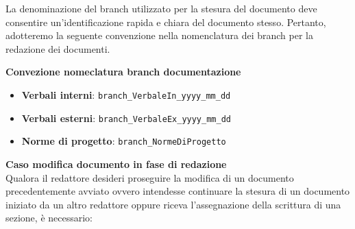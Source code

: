 \documentclass{article}
\begin{document}
    La denominazione del branch utilizzato per la stesura del documento deve consentire un'identificazione rapida e chiara del documento stesso. Pertanto, adotteremo la seguente convenzione nella nomenclatura dei branch per la redazione dei documenti.

    \vspace{0.3cm}
    \textbf{Convezione nomeclatura branch documentazione}
    \begin{itemize}
        \item \textbf{Verbali interni}: \verb|branch_VerbaleIn_yyyy_mm_dd|
        \item \textbf{Verbali esterni}: \verb|branch_VerbaleEx_yyyy_mm_dd|
        \item \textbf{Norme di progetto}: \verb|branch_NormeDiProgetto|
    \end{itemize}

    \textbf{Caso modifica documento in fase di redazione}\\
   Qualora il redattore desideri proseguire la modifica di un documento precedentemente avviato ovvero intendesse continuare la stesura di un documento iniziato da un altro redattore oppure riceva l'assegnazione della scrittura di una sezione, è necessario:
    
\end{document}
